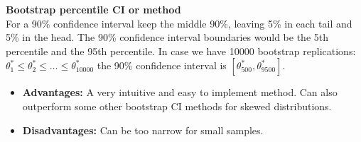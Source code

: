 \textbf{Bootstrap percentile CI or  method} \\
For a 90\% confidence interval keep the middle 90\%, leaving 5\% in each tail and 5\% in the head. The 90\% confidence interval boundaries would be the 5th percentile and the 95th percentile. In case we have 10000 bootstrap replications: $\theta^\ast_1\le\theta^\ast_2\le\dots\le\theta^\ast_{10000}$ the 90\% confidence interval is $[\theta^\ast_{500},\theta^\ast_{9500}]$.
\begin{itemize}
	\item \textbf{Advantages:} A very intuitive and easy to implement method. Can also outperform some other bootstrap CI methods for skewed distributions.
	\item \textbf{Disadvantages:} Can be too narrow for small samples.
\end{itemize}